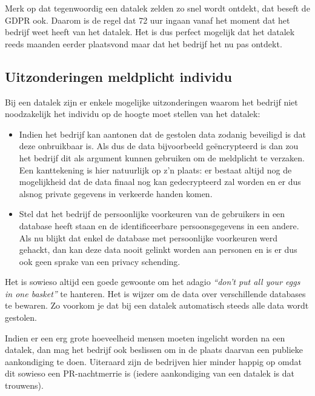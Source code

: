 \documentclass[
  10pt,
  dutch,
  paper=a4,
  ,captions=tableheading
]{scrbook}
\providecommand{\tightlist}{%
  \setlength{\itemsep}{0pt}\setlength{\parskip}{0pt}}
\begin{document}
Merk op dat tegenwoordig een datalek zelden zo snel wordt ontdekt, dat
beseft de GDPR ook. Daarom is de regel dat 72 uur ingaan vanaf het
moment dat het bedrijf weet heeft van het datalek. Het is dus perfect
mogelijk dat het datalek reeds maanden eerder plaatsvond maar dat het
bedrijf het nu pas ontdekt.

\subsection{Uitzonderingen meldplicht
individu}\label{uitzonderingen-meldplicht-individu}

Bij een datalek zijn er enkele mogelijke uitzonderingen waarom het
bedrijf niet noodzakelijk het individu op de hoogte moet stellen van het
datalek:

\begin{itemize}
\tightlist
\item
  Indien het bedrijf kan aantonen dat de gestolen data zodanig beveiligd
  is dat deze onbruikbaar is. Als dus de data bijvoorbeeld geëncrypteerd
  is dan zou het bedrijf dit als argument kunnen gebruiken om de
  meldplicht te verzaken. Een kanttekening is hier natuurlijk op z'n
  plaats: er bestaat altijd nog de mogelijkheid dat de data finaal nog
  kan gedecrypteerd zal worden en er dus alsnog private gegevens in
  verkeerde handen komen.
\item
  Stel dat het bedrijf de persoonlijke voorkeuren van de gebruikers in
  een database heeft staan en de identificeerbare persoonsgegevens in
  een andere. Als nu blijkt dat enkel de database met persoonlijke
  voorkeuren werd gehackt, dan kan deze data nooit gelinkt worden aan
  personen en is er dus ook geen sprake van een privacy schending.
\end{itemize}

\begin{tipblock}
Het is sowieso altijd een goede gewoonte om het adagio \emph{``don't put
all your eggs in one basket''} te hanteren. Het is wijzer om de data
over verschillende databases te bewaren. Zo voorkom je dat bij een
datalek automatisch steeds alle data wordt gestolen.
\end{tipblock}

\begin{warningblock}
Indien er een erg grote hoeveelheid mensen moeten ingelicht worden na
een datalek, dan mag het bedrijf ook beslissen om in de plaats daarvan
een publieke aankondiging te doen. Uiteraard zijn de bedrijven hier
minder happig op omdat dit sowieso een PR-nachtmerrie is (iedere
aankondiging van een datalek is dat trouwens).
\end{warningblock}
\end{document}
